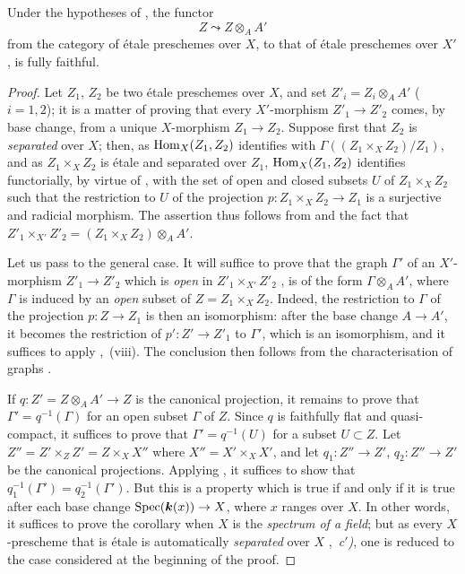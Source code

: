 \begin{corollary}[18.9.5]
\label{IV.18.9.5}
Under the hypotheses of , the functor
\begin{equation}
  Z\leadsto Z\otimes_{A}A'
  \tag{18.9.5.1}
\label{IV.18.9.5.1}
\end{equation}
from the category of \'{e}tale preschemes over $X$, to that of \'{e}tale preschemes over $X'$, is fully faithful.
\end{corollary}

\begin{proof}
Let $Z_1$, $Z_2$ be two \'{e}tale preschemes over $X$, and set $Z'_i=Z_i\otimes_{A}A'$ ($i=1,2$);
it is a matter of proving that every $X'$-morphism $Z'_1\to Z'_2$ comes, by base change, from a unique $X$-morphism $Z_1\to Z_2$.
Suppose first that $Z_2$ is \emph{separated} over $X$;
then, as $\operatorname{Hom}_{X}(Z_1,Z_2)$ identifies with $\Gamma((Z_1\times_{X}Z_2)/Z_1)$, and as $Z_1\times_{X}Z_2$ is \'{e}tale and separated over $Z_1$, $\operatorname{Hom}_{X}(Z_1,Z_2)$ identifies functorially, by virtue of , with the set of open and closed subsets $U$ of $Z_1\times_{X}Z_2$ such that the restriction to $U$ of the projection $p:Z_1\times_{X}Z_2\to Z_1$ is a surjective and radicial morphism.
The assertion thus follows from  and the fact that $Z'_1\times_{X'}Z'_2=(Z_1\times_{X}Z_2)\otimes_{A}A'$.

Let us pass to the general case.
It will suffice to prove that the graph $\Gamma'$ of an $X'$-morphism $Z'_1\to Z'_2$ which is \emph{open} in $Z'_1\times_{X'}Z'_2$ , is of the form $\Gamma\otimes_{A}A'$, where $\Gamma$ is induced by an \emph{open} subset of $Z=Z_1\times_{X}Z_2$.
Indeed, the restriction to $\Gamma$ of the projection $p:Z\to Z_1$ is then an isomorphism: after the base change $A\to A'$, it becomes the restriction of $p':Z'\to Z'_1$ to $\Gamma'$, which is an isomorphism, and it suffices to apply ,~(viii).
The conclusion then follows from the characterisation of graphs .

If $q:Z'=Z\otimes_{A}A'\to Z$ is the canonical projection, it remains to prove that $\Gamma'=q^{-1}(\Gamma)$ for an open subset $\Gamma$ of $Z$.
Since $q$ is faithfully flat and quasi-compact, it suffices  to prove that $\Gamma'=q^{-1}(U)$ for a subset $U\subset Z$.
Let $Z''=Z'\times_{Z}Z'=Z\times_{X}X''$ where $X''=X'\times_{X}X'$, and let $q_1:Z''\to Z'$, $q_2:Z''\to Z'$ be the canonical projections.
Applying , it suffices to show that $q_1^{-1}(\Gamma')=q_2^{-1}(\Gamma')$.
But this is a property which is true if and only if it is true after each base change $\operatorname{Spec}(\boldsymbol{k}(x))\to X$, where $x$ ranges over $X$.
In other words, it suffices to prove the corollary when $X$ is the \emph{spectrum of a field};
but as every $X$-prescheme that is \'{e}tale is automatically \emph{separated} over $X$ ,~\emph{c$'$)}, one is reduced to the case considered at the beginning of the proof.
\end{proof}

